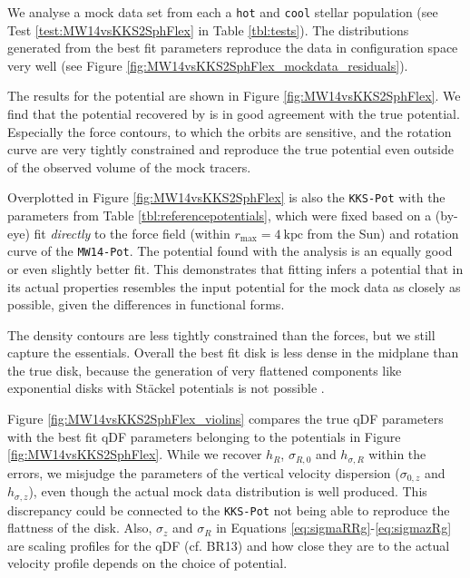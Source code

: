 


We analyse a mock data set from each a \texttt{hot} and \texttt{cool} stellar population (see Test \ref{test:MW14vsKKS2SphFlex} in Table \ref{tbl:tests}). The distributions generated from the best fit parameters reproduce the data in configuration space very well (see Figure \ref{fig:MW14vsKKS2SphFlex_mockdata_residuals}).

The results for the potential are shown in Figure \ref{fig:MW14vsKKS2SphFlex}. We find that the potential recovered by \RM{} is in good agreement with the true potential. Especially the force contours, to which the orbits are sensitive, and the rotation curve are very tightly constrained and reproduce the true potential even outside of the observed volume of the mock tracers.

Overplotted in Figure \ref{fig:MW14vsKKS2SphFlex} is also the \texttt{KKS-Pot} with the parameters from Table \ref{tbl:referencepotentials}, which were fixed based on a (by-eye) fit \emph{directly} to the force field (within $r_\text{max}=4~\text{kpc}$ from the Sun) and rotation curve of the \texttt{MW14-Pot}. The potential found with the \RM{} analysis is an equally good or even slightly better fit. This demonstrates that \RM{} fitting infers a potential that in its actual properties resembles the input potential for the mock data as closely as possible, given the differences in functional forms.

The density contours are less tightly constrained than the forces, but we still capture the essentials. Overall the best fit disk is less dense in the midplane than the true disk, because the generation of very flattened components like exponential disks with St\"{a}ckel potentials is not possible .


Figure \ref{fig:MW14vsKKS2SphFlex_violins} compares the true qDF parameters with the best fit qDF parameters belonging to the potentials in Figure \ref{fig:MW14vsKKS2SphFlex}. While we recover $h_R$, $\sigma_{R,0}$ and $h_{\sigma,R}$ within the errors, we misjudge the parameters of the vertical velocity dispersion ($\sigma_{0,z}$ and $h_{\sigma,z}$), even though the actual mock data distribution is well produced. This discrepancy could be connected to the \texttt{KKS-Pot} not being able to reproduce the flattness of the disk. Also, $\sigma_z$ and $\sigma_R$ in Equations \ref{eq:sigmaRRg}-\ref{eq:sigmazRg} are scaling profiles for the qDF (cf. BR13) and how close they are to the actual velocity profile depends on the choice of potential.










